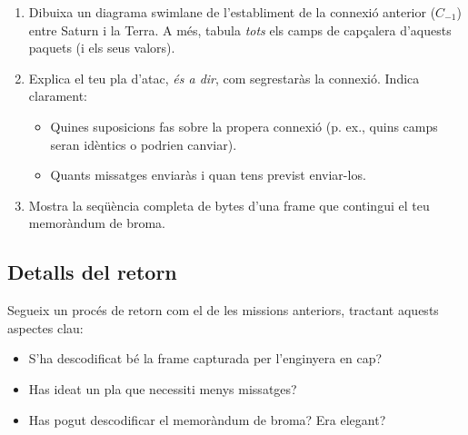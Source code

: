 \begin{enumerate}[itemsep=0.1cm]
\item Dibuixa un diagrama swimlane de l'establiment de la connexió anterior ($C_{-1}$) entre Saturn i la Terra.
A més, tabula \textit{tots} els camps de capçalera d'aquests paquets (i els seus valors).

\item Explica el teu pla d'atac, \textit{és a dir}, com segrestaràs la connexió. Indica clarament:
    \begin{itemize}
    \item Quines suposicions fas sobre la propera connexió (p. ex., quins camps seran idèntics o podrien canviar).
    \item Quants missatges enviaràs i quan tens previst enviar-los.
    \end{itemize}

\item Mostra la seqüència completa de bytes d'una frame que contingui el teu memoràndum de broma.
\end{enumerate}

\subsection*{Detalls del retorn}

Segueix un procés de retorn com el de les missions anteriors, tractant aquests aspectes clau:
\begin{itemize}
\item S'ha descodificat bé la frame capturada per l'enginyera en cap?
\item Has ideat un pla que necessiti menys missatges?
\item Has pogut descodificar el memoràndum de broma? Era elegant?
\end{itemize}

